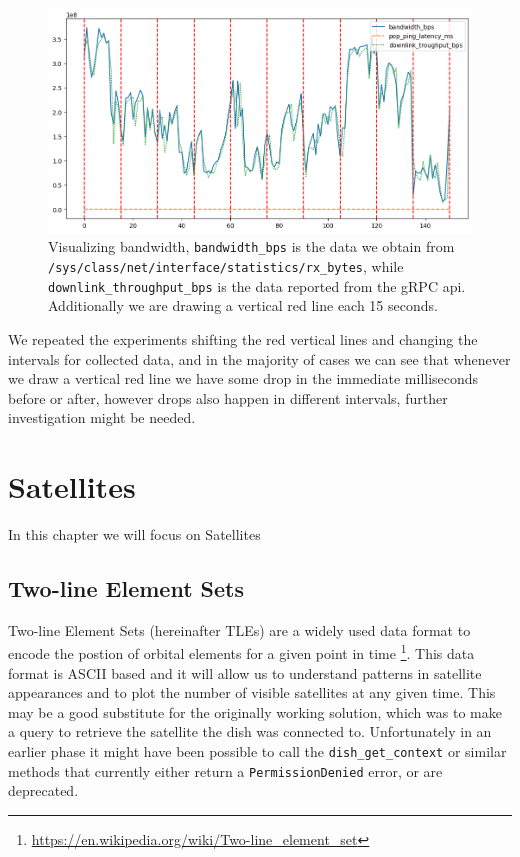 \documentclass[IN,11pt,twoside,openright,bachelor,english]{tumthesis}
\begin{document}
\begin{figure}
	\centering
	\includegraphics[width=1\columnwidth]{img/bw-15seconds.png}
	\caption{Visualizing bandwidth, \texttt{bandwidth\_bps} is the data we obtain from \texttt{/sys/class/net/{interface}/statistics/rx\_bytes}, while \texttt{downlink\_throughput\_bps} is the data reported from the gRPC api. Additionally we are drawing a vertical red line each 15 seconds.}
	\label{fig:vis-bw-15sec}
\end{figure}

We repeated the experiments shifting the red vertical lines and changing the intervals for collected data, and in the majority of cases we can see that whenever we draw a vertical red line we have some drop in the immediate milliseconds before or after, however drops also happen in different intervals, further investigation might be needed.


\chapter{Satellites}
\label{chap:sats}

In this chapter we will focus on Satellites
\section{Two-line Element Sets}
Two-line Element Sets (hereinafter TLEs) are a widely used data format to encode the postion of orbital elements for a given point in time \footnote{\url{https://en.wikipedia.org/wiki/Two-line_element_set}}. This data format is ASCII based and it will allow us to understand patterns in satellite appearances and to plot the number of visible satellites at any given time. This may be a good substitute for the originally working solution, which was to make a query to retrieve the satellite the dish was connected to. Unfortunately in an earlier phase it might have been possible to call the \texttt{dish\_get\_context} or similar methods that currently either return a \texttt{PermissionDenied} error, or are deprecated.
\end{document}
